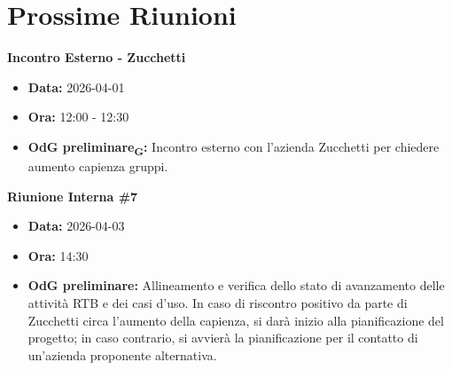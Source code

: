 \section{Prossime Riunioni}

\textbf{Incontro Esterno - Zucchetti}
\begin{itemize}
    \item \textbf{Data:} 2026-04-01
    \item \textbf{Ora:} 12:00 - 12:30
    \item \textbf{OdG preliminare\textsubscript{G}:} Incontro esterno con l'azienda Zucchetti per chiedere aumento capienza gruppi.
\end{itemize}

\vspace{0.3cm}

\textbf{Riunione Interna \#7}
\begin{itemize}
    \item \textbf{Data:} 2026-04-03
    \item \textbf{Ora:} 14:30
    \item \textbf{OdG preliminare:} Allineamento e verifica dello stato di avanzamento delle attività RTB e dei casi d’uso. In caso di riscontro positivo da parte di Zucchetti circa l'aumento della capienza, si darà inizio alla pianificazione del progetto; in caso contrario, si avvierà la pianificazione per il contatto di un'azienda proponente alternativa.
\end{itemize}